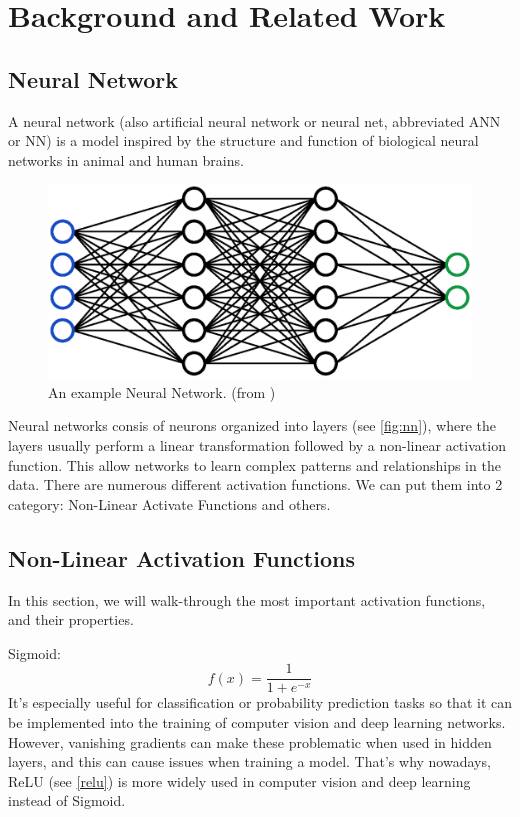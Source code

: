 \chapter{Background and Related Work}
\label{ch:background}

\section{Neural Network}
A neural network (also artificial neural network or neural net, abbreviated ANN
or NN) is a model inspired by the structure and function of biological neural networks
in animal and human brains.
\begin{figure}[H]
	\centering
	\includegraphics[width=1\linewidth]{images/network.eps}
	\caption{An example Neural Network. (from \cite{pic4nn})}
	\label{fig:nn}
\end{figure}
Neural networks consis of neurons organized into layers (see \autoref{fig:nn}), where the layers usually perform a linear transformation followed by a non-linear activation function. This allow networks to learn complex patterns and relationships in the data.
There are numerous different activation functions. We can put them into 2
category: Non-Linear Activate Functions and others.

\section{Non-Linear Activation Functions}
In this section, we will walk-through the most important activation functions, and their properties.

Sigmoid:
\begin{equation}
	f(x)=\frac{1}{1+e^{-x}}\label{sigmoid}
\end{equation}
It’s especially useful for classification or probability prediction tasks so
that it can be implemented into the training of computer vision and deep
learning networks. However, vanishing gradients can make these problematic when
used in hidden layers, and this can cause issues when training a model. That's why nowadays, ReLU (see \autoref{relu}) is more widely
used in computer vision and deep learning instead of Sigmoid.

